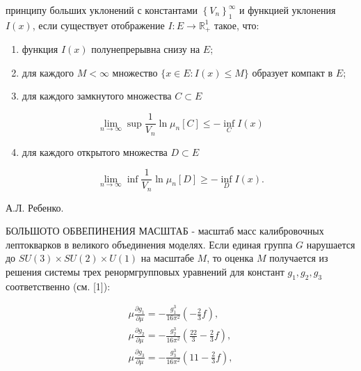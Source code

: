 \documentclass[10pt]{article}
\begin{document}
принципу больших уклонений с константами $\left\{V_{n}\right\}_{1}^{\infty}$ и функцией уклонения $I(x)$, если существует отображение $I: E \rightarrow \mathbb{R}_{+}^{1}$ такое, что:



\begin{enumerate}

  \item функция $I(x)$ полунепрерывна снизу на $E$;



  \item для каждого $M<\infty$ множество $\{x \in E: I(x) \leqslant M\}$ образует компакт в $E$;



  \item для каждого замкнутого множества $C \subset E$



\end{enumerate}



\[

\lim _{n \rightarrow \infty} \sup \frac{1}{V_{n}} \ln \mu_{n}[C] \leqslant-\inf _{C} I(x)

\]



\begin{enumerate}

  \setcounter{enumi}{3}

  \item для каждого открытого множества $D \subset E$

\end{enumerate}



\[

\lim _{n \rightarrow \infty} \inf \frac{1}{V_{n}} \ln \mu_{n}[D] \geqslant-\inf _{D} I(x) .

\]



А.Л. Ребенко.



БОЛЬШОТО ОБВЕПИНЕНИЯ МАСШТАБ - масштаб масс калибровочных лептокварков в великого объединения моделях. Если единая группа $G$ нарушается до $S U(3) \times S U(2) \times U(1)$ на масштабе $M$, то оценка $M$ получается из решения системы трех ренормгрупповых уравнений для констант $g_{1}, g_{2}, g_{3}$ соответственно (см. [1]):



\[

\begin{gathered}

\mu \frac{\partial g_{1}}{\partial \mu}=-\frac{g_{1}^{3}}{16 \pi^{2}}\left(-\frac{2}{3} f\right), \\

\mu \frac{\partial g_{2}}{\partial \mu}=-\frac{g_{2}^{3}}{16 \pi^{2}}\left(\frac{22}{3}-\frac{2}{3} f\right), \\

\mu \frac{\partial g_{3}}{\partial \mu}=-\frac{g_{3}^{3}}{16 \pi^{2}}\left(11-\frac{2}{3} f\right),

\end{gathered}

\]
\end{document}
